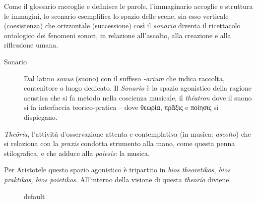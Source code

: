 \documentclass{gs}
\begin{document}
Come il glossario raccoglie e definisce le parole, l'immaginario accoglie e struttura le immagini, lo scenario esemplifica lo spazio delle scene, sia esso verticale (coesistenza) che orizzontale (successione) così il \emph{sonario} diventa il ricettacolo ontologico dei fenomeni sonori, in relazione all'ascolto, alla creazione e alla riflessione umana.

\begin{description}

  \item[Sonario] Dal latino \emph{sonus} (suono) con il suffisso \emph{-arium} che indica raccolta, contenitore o luogo dedicato. Il \emph{Sonario} è lo spazio agonistico della ragione acustica che si fa metodo nella coscienza musicale, il \emph{théatron} dove il suono si fa interfaccia teorico-pratica – dove \textgreek{θεωρία}, \textgreek{πρᾶξις} e \textgreek{ποίησις} si dispiegano.

\end{description}

\emph{Theōría}, l'attività d'osservazione attenta e contemplativa (in musica: \emph{ascolto}) che si relaziona con la \emph{praxis} condotta strumento alla mano, come questa penna stilografica, e che adduce alla \emph{poiesis}: la musica.

Per Aristotele questo spazio agonistico è tripartito in \emph{bios theoretikos, bios praktikos, bios poietikos}. All'interno della visione di questa \emph{theōría} diviene

\begin{figure}[htbp]
\begin{center}
\caption{default}
\label{default}
\end{center}
\end{figure}
\end{document}
